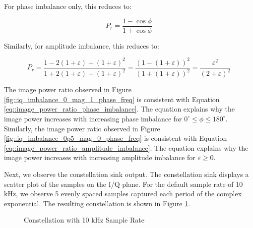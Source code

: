 \documentclass{article}
\begin{document}
For phase imbalance only, this reduces to:

\begin{equation}
	P_r = \frac{1-\cos\phi}{1+\cos\phi} \label{eq::image_power_ratio_phase_imbalance}
\end{equation}

Similarly, for amplitude imbalance, this reduces to:

\begin{equation}
	P_r = \frac{1-2(1+\varepsilon)+(1+\varepsilon)^2}{1+2(1+\varepsilon)+(1+\varepsilon)^2} = \frac{(1-(1+\varepsilon))^2}{(1+(1+\varepsilon))^2} = \frac{\varepsilon^2}{(2+\varepsilon)^2} \label{eq::image_power_ratio_amplitude_imbalance}
\end{equation}

The image power ratio observed in Figure \ref{fig::iq_imbalance_0_mag_1_phase_freq} is consistent with Equation \ref{eq::image_power_ratio_phase_imbalance}. The equation explains why the image power increases with increasing phase imbalance for $0^{\circ} \leq \phi \leq 180^{\circ}$. Similarly, the image power ratio observed in Figure \ref{fig::iq_imbalance_0p5_mag_0_phase_freq} is consistent with Equation \ref{eq::image_power_ratio_amplitude_imbalance}. The equation explains why the image power increases with increasing amplitude imbalance for $\varepsilon \geq 0$.

Next, we observe the constellation sink output. The constellation sink displays a scatter plot of the samples on the I/Q plane. For the default sample rate of 10 kHz, we observe 5 evenly spaced samples captured each period of the complex exponential. The resulting constellation is shown in Figure \ref{fig::iq_imbalance_0_mag_0_phase_10k_samp_rate_const}.
 
\begin{figure}[H]
	\centerline{}
	\caption{Constellation with 10 kHz Sample Rate}
	\label{fig::iq_imbalance_0_mag_0_phase_10k_samp_rate_const}
\end{figure}
\end{document}
